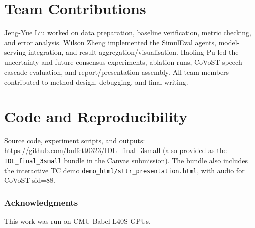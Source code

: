 \documentclass{article}
\begin{document}
\section*{Team Contributions}

Jeng-Yue Liu worked on data preparation, baseline verification, metric checking, and error
analysis. Wilson Zheng implemented the SimulEval agents, model-serving integration, and result
aggregation/visualisation. Haoling Pu led the uncertainty and future-consensus experiments,
ablation runs, CoVoST speech-cascade evaluation, and report/presentation assembly. All team
members contributed to method design, debugging, and final writing.

\section*{Code and Reproducibility}

Source code, experiment scripts, and outputs:
\url{https://github.com/buffett0323/IDL_final_3small} (also provided as the
\texttt{IDL\_final\_3small} bundle in the Canvas submission). The bundle also includes the
interactive TC demo \texttt{demo\_html/sttr\_presentation.html}, with audio for CoVoST sid=88.

\subsubsection*{Acknowledgments}
This work was run on CMU Babel L40S GPUs.
\end{document}
